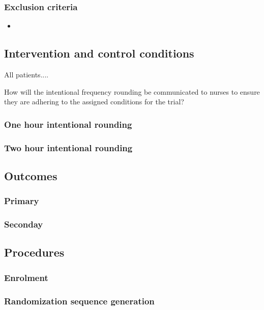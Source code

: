 \documentclass[12pt]{article}
\begin{document}
\subsubsection{Exclusion criteria}
\begin{itemize}
    \item 
\end{itemize}

\subsection{Intervention and control conditions}
All patients....

How will the intentional frequency rounding be communicated to nurses to ensure they are adhering to the assigned conditions for the trial?

\subsubsection{One hour intentional rounding}

\subsubsection{Two hour intentional rounding}

\subsection{Outcomes}

\subsubsection{Primary}

\subsubsection{Seconday}

\subsection{Procedures}

\subsubsection{Enrolment}

\subsubsection{Randomization sequence generation}
\end{document}
